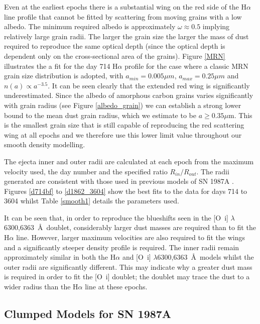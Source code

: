 \documentclass[useAMS,usenatbib,usegraphicx]{mnras}
\begin{document}
Even at the earliest epochs there is a substantial wing on the red side of 
the H$\alpha$ line profile that cannot be fitted by scattering from moving grains with a low albedo.  The 
minimum required albedo is approximately $\omega \approx 0.5$ implying relatively large grain radii.  The larger 
the grain size the larger the mass of dust required to reproduce the same 
optical depth (since the optical depth is dependent only on the 
cross-sectional area of the grains).  Figure \ref{MRN} illustrates the 
a fit for the day 714 H$\alpha$ profile for the case where a classic MRN \citep{Mathis1977} grain size 
distribution is adopted, with $a_{min}=0.005 \mu m$, $a_{max}=0.25 \mu m$ 
and $n(a) \propto a^{-3.5}$.  It can be seen clearly that the extended red wing is 
significantly underestimated.  Since the albedo of  
amorphous carbon grains varies significantly with grain radius (see Figure \ref{albedo_grain}) we can establish a strong 
lower bound to the mean dust grain radius, which we estimate to be $a \ge 0.35\mu$m.  This is the smallest grain size that is still 
capable of reproducing the red scattering wing at all epochs and we 
therefore use this lower limit value throughout our smooth density modelling.

The ejecta inner and outer radii are calculated at each epoch from the maximum 
velocity used, the day number and the specified ratio $R_{in}/R_{out}$.  
The radii generated are consistent with those used in previous models of 
SN 1987A \citep{Ercolano2007, Wesson2015}.  Figures \ref{d714bf} to 
\ref{d1862_3604} show the best fits to the data for days 714 to 3604 whilst 
Table \ref{smooth1} details the parameters used.

It can be seen that, in order to reproduce the blueshifts seen in the 
[O~{\sc i}] $\lambda$6300,6363~\AA\ doublet, considerably larger dust masses 
are required than to fit the H$\alpha$ line.  However, larger maximum 
velocities are also required to fit the wings and a significantly steeper 
density profile is required.  The inner radii remain approximately similar 
in both the H$\alpha$ and [O~{\sc i}] $\lambda$6300,6363~\AA\ models whilst the 
outer radii are significantly different.  This may indicate why a greater 
dust mass is required in order to fit the [O~{\sc i}] doublet; the doublet may
trace the dust to a wider radius than the H$\alpha$ line at these epochs.


\subsection{Clumped Models for SN 1987A}
\label{clumped_models}
\end{document}
